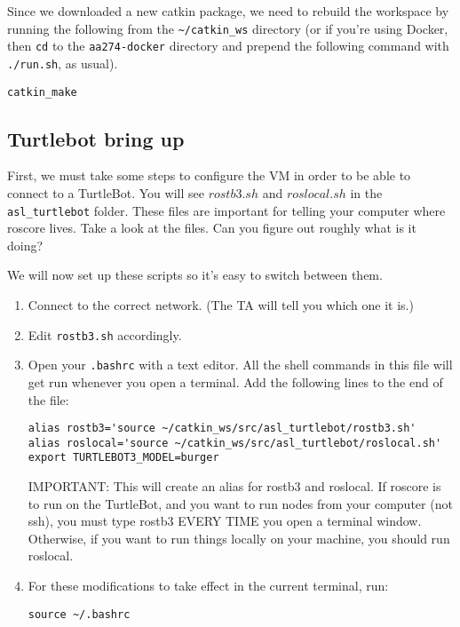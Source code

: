 \documentclass{article}
\begin{document}
Since we downloaded a new catkin package, we need to rebuild the workspace by running the following from the \texttt{\textasciitilde/catkin\_ws} directory (or if you're using Docker, then \texttt{cd} to the \texttt{aa274-docker} directory and prepend the following command with \texttt{./run.sh}, as usual).

\begin{lstlisting}
catkin_make
\end{lstlisting}

\subsection{Turtlebot bring up}
First, we must take some steps to configure the VM in order to be able to connect to a TurtleBot. You will see $rostb3.sh$ and $roslocal.sh$ in the \texttt{asl\_turtlebot} folder. These files are important for telling your computer where roscore lives. Take a look at the files. Can you figure out roughly what is it doing?

We will now set up these scripts so it's easy to switch between them.
\begin{enumerate}
	\item Connect to the correct network. (The TA will tell you which one it is.)
	\item Edit \texttt{rostb3.sh} accordingly.
	\item Open your \texttt{.bashrc} with a text editor. All the shell commands in this file will get run whenever you open a terminal.
	Add the following lines to the end of the file:
	\begin{lstlisting}
alias rostb3='source ~/catkin_ws/src/asl_turtlebot/rostb3.sh'
alias roslocal='source ~/catkin_ws/src/asl_turtlebot/roslocal.sh'
export TURTLEBOT3_MODEL=burger
	\end{lstlisting}
	
	IMPORTANT: This will create an alias for rostb3 and roslocal. If roscore is to run on the TurtleBot, and you want to run nodes from your computer (not ssh), you must type rostb3 EVERY TIME you open a terminal window. Otherwise, if you want to run things locally on your machine, you should run roslocal.
	\item For these modifications to take effect in the current terminal, run:
	\begin{lstlisting}
source ~/.bashrc
	\end{lstlisting}
\end{enumerate}
\end{document}
